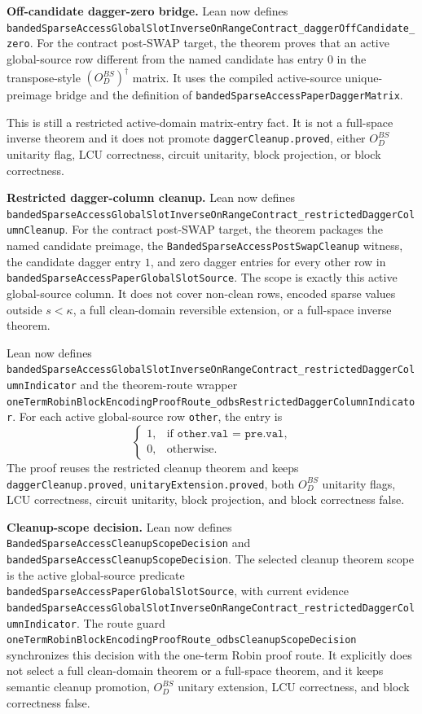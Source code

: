 \textbf{Off-candidate dagger-zero bridge.}
Lean now defines
\texttt{bandedSparseAccessGlobalSlotInverseOnRangeContract\_daggerOffCandidate\_zero}.
For the contract post-SWAP target, the theorem proves that an active
global-source row different from the named candidate has entry \(0\) in the
transpose-style \((O_D^{BS})^\dagger\) matrix.  It uses the compiled
active-source unique-preimage bridge and the definition of
\texttt{bandedSparseAccessPaperDaggerMatrix}.

This is still a restricted active-domain matrix-entry fact.  It is not a
full-space inverse theorem and it does not promote
\texttt{daggerCleanup.proved}, either \(O_D^{BS}\) unitarity flag, LCU
correctness, circuit unitarity, block projection, or block correctness.

\textbf{Restricted dagger-column cleanup.}
Lean now defines
\texttt{bandedSparseAccessGlobalSlotInverseOnRangeContract\_restrictedDaggerColumnCleanup}.
For the contract post-SWAP target, the theorem packages the named candidate
preimage, the \texttt{BandedSparseAccessPostSwapCleanup} witness, the
candidate dagger entry \(1\), and zero dagger entries for every other row in
\texttt{bandedSparseAccessPaperGlobalSlotSource}.  The scope is exactly this
active global-source column.  It does not cover non-clean rows, encoded sparse
values outside \(s<\kappa\), a full clean-domain reversible extension, or a
full-space inverse theorem.

Lean now defines
\texttt{bandedSparseAccessGlobalSlotInverseOnRangeContract\_restrictedDaggerColumnIndicator}
and the theorem-route wrapper
\texttt{oneTermRobinBlockEncodingProofRoute\_odbsRestrictedDaggerColumnIndicator}.
For each active global-source row \texttt{other}, the entry is
\[
  \begin{cases}
    1, & \text{if }\texttt{other.val = pre.val},\\
    0, & \text{otherwise}.
  \end{cases}
\]
The proof reuses the restricted cleanup theorem and keeps
\texttt{daggerCleanup.proved}, \texttt{unitaryExtension.proved}, both
\(O_D^{BS}\) unitarity flags, LCU correctness, circuit unitarity, block
projection, and block correctness false.

\textbf{Cleanup-scope decision.}
Lean now defines
\texttt{BandedSparseAccessCleanupScopeDecision} and
\texttt{bandedSparseAccessCleanupScopeDecision}.  The selected cleanup theorem
scope is the active global-source predicate
\texttt{bandedSparseAccessPaperGlobalSlotSource}, with current evidence
\texttt{bandedSparseAccessGlobalSlotInverseOnRangeContract\_restrictedDaggerColumnIndicator}.
The route guard
\texttt{oneTermRobinBlockEncodingProofRoute\_odbsCleanupScopeDecision}
synchronizes this decision with the one-term Robin proof route.  It explicitly
does not select a full clean-domain theorem or a full-space theorem, and it
keeps semantic cleanup promotion, \(O_D^{BS}\) unitary extension, LCU
correctness, and block correctness false.

